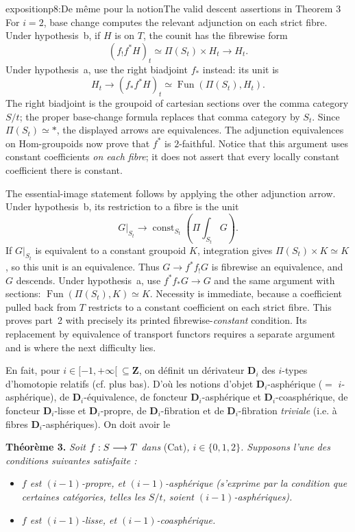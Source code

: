 \begin{dcomment}{exposition}{p8:De même pour la notion}{The valid descent assertions in Theorem 3}
For $i=2$, base change computes the relevant adjunction on each strict fibre. Under hypothesis~b, if $H$ is on $T$, the counit has the fibrewise form
\[
 (f_!f^*H)_t\simeq\Pi(S_t)\times H_t
 \longrightarrow H_t.
\]
Under hypothesis~a, use the right biadjoint $f_*$ instead: its unit is
\[
 H_t\longrightarrow(f_*f^*H)_t
 \simeq\operatorname{Fun}(\Pi(S_t),H_t).
\]
The right biadjoint is the groupoid of cartesian sections over the comma category $S/t$; the proper base-change formula replaces that comma category by $S_t$. Since $\Pi(S_t)\simeq*$, the displayed arrows are equivalences. The adjunction equivalences on Hom-groupoids now prove that $f^*$ is $2$-faithful. Notice that this argument uses constant coefficients \emph{on each fibre}; it does not assert that every locally constant coefficient there is constant.

The essential-image statement follows by applying the other adjunction arrow. Under hypothesis~b, its restriction to a fibre is the unit
\[
 G|_{S_t}\longrightarrow
 \operatorname{const}_{S_t}\!\left(\Pi\!\int_{S_t}G\right).
\]
If $G|_{S_t}$ is equivalent to a constant groupoid $K$, integration gives $\Pi(S_t)\times K\simeq K$, so this unit is an equivalence. Thus $G\to f^*f_!G$ is fibrewise an equivalence, and $G$ descends. Under hypothesis~a, use $f^*f_*G\to G$ and the same argument with sections: $\operatorname{Fun}(\Pi(S_t),K)\simeq K$. Necessity is immediate, because a coefficient pulled back from $T$ restricts to a constant coefficient on each strict fibre. This proves part~2 with precisely its printed fibrewise-\emph{constant} condition. Its replacement by equivalence of transport functors requires a separate argument and is where the next difficulty lies.
\end{dcomment}


En fait, pour $i \in [-1,+\infty[ \ \subseteq \mathbf{Z}$, on définit un dérivateur $\mathbf{D}_i$ des $i$-types d'homotopie relatifs (cf. plus bas). D'où les notions d'objet $\mathbf{D}_i$-asphérique ($=$ $i$-asphérique), de $\mathbf{D}_i$-équivalence, de foncteur $\mathbf{D}_i$-asphérique et $\mathbf{D}_i$-coasphérique, de foncteur $\mathbf{D}_i$-lisse et $\mathbf{D}_i$-propre, de $\mathbf{D}_i$-fibration et de $\mathbf{D}_i$-fibration \textit{triviale} (i.e. à fibres $\mathbf{D}_i$-asphériques). On doit avoir le

\textbf{Théorème 3.} \textit{Soit $f : S \longrightarrow T$ dans} (Cat)\textit{, $i \in \{0,1,2\}$. Supposons l'une des conditions suivantes satisfaite :}

\begin{itemize}[leftmargin=3em]
\item[\textit{a)}] \textit{$f$ est $(i-1)$-propre, et $(i-1)$-asphérique (s'exprime par la condition que certaines catégories, telles les $S/t$, soient $(i-1)$-asphériques).}
\item[\textit{b)}] \textit{$f$ est $(i-1)$-lisse, et $(i-1)$-coasphérique.}
\end{itemize}


